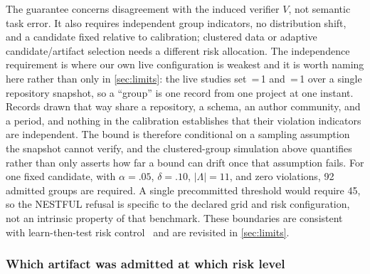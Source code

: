 \noindent The guarantee concerns disagreement with the induced verifier $V$, not semantic
task error.  It also requires independent group indicators, no distribution shift, and a
candidate fixed relative to calibration; clustered data or adaptive candidate/artifact
selection needs a different risk allocation.  The independence requirement is where our own live configuration is weakest
and it is worth naming here rather than only in \cref{sec:limits}: the live studies set
\,=\,1 and \,=\,1 over a single repository snapshot,
so a ``group'' is one record from one project at one instant.  Records drawn that way share
a repository, a schema, an author community, and a period, and nothing in the calibration
establishes that their violation indicators are independent.  The bound is therefore
conditional on a sampling assumption the snapshot cannot verify, and the clustered-group
simulation above quantifies rather than only asserts how far a bound can drift once that
assumption fails.  For one fixed candidate,
with $\alpha=.05$, $\delta=.10$, $|\Lambda|=11$, and zero violations, 92 admitted groups
are required.  A single precommitted threshold would require 45, so the
NESTFUL refusal is specific to the declared grid and risk configuration, not an intrinsic
property of that benchmark.  These boundaries are consistent with learn-then-test risk
control~\cite{angelopoulos2022ltt,bates2021rcps} and are revisited in
\cref{sec:limits}.

\subsubsection{Which artifact was admitted at which risk level}
\label{sec:admission-register}

\begin{table}[t]
  \centering
  \caption{Selective-risk configuration of every admitted artifact, generated from the
  sealed gates rather than restated in prose.  These are per-candidate threshold-grid
  certificates, not candidate-search-adjusted compiler-wide guarantees.  $\alpha=.05$ is the paper's registered
  target; three artifacts were calibrated at $\alpha=.10$ and do \emph{not} meet it.  All
  seven use $\delta=.10$ and the same 11-threshold grid, and all record zero calibration
  violations.  Results resting on a row marked \textbf{no} are licensed only at the 10\%
  selective-risk level.}
  \label{tab:admission-register}
  \small
  
\end{table}

